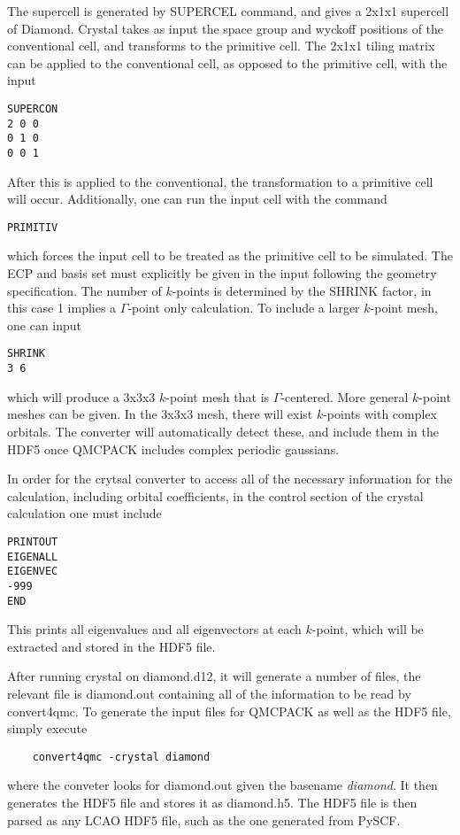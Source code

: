 The supercell is generated by SUPERCEL command, and gives a 2x1x1 supercell of Diamond. 
Crystal takes as input the space group and wyckoff positions of the conventional cell, and transforms to the primitive cell.
The 2x1x1 tiling matrix can be applied to the conventional cell, as opposed to the primitive cell, with the input
\begin{lstlisting}
SUPERCON
2 0 0
0 1 0
0 0 1
\end{lstlisting}
After this is applied to the conventional, the transformation to a primitive cell will occur.
Additionally, one can run the input cell with the command
\begin{lstlisting}
PRIMITIV
\end{lstlisting}
which forces the input cell to be treated as the primitive cell to be simulated.
The ECP and basis set must explicitly be given in the input following the geometry specification.
The number of $k$-points is determined by the SHRINK factor, in this case 1 implies a $\Gamma$-point only calculation. 
To include a larger $k$-point mesh, one can input
\begin{lstlisting}
SHRINK
3 6
\end{lstlisting}
which will produce a 3x3x3 $k$-point mesh that is $\Gamma$-centered. 
More general $k$-point meshes can be given. 
In the 3x3x3 mesh, there will exist $k$-points with complex orbitals. 
The converter will automatically detect these, and include them in the HDF5 once QMCPACK includes complex periodic gaussians. 


In order for the crytsal converter to access all of the necessary information for the calculation, including orbital coefficients, in the control section of the crystal calculation one must include
\begin{lstlisting}
PRINTOUT
EIGENALL
EIGENVEC
-999
END
\end{lstlisting}
This prints all eigenvalues and all eigenvectors at each $k$-point, which will be extracted and stored in the HDF5 file.


After running crystal on diamond.d12, it will generate a number of files, the relevant file is diamond.out containing all of the information to be read by convert4qmc.
To generate the input files for QMCPACK as well as the HDF5 file, simply execute
\begin{lstlisting}
    convert4qmc -crystal diamond
\end{lstlisting}
where the conveter looks for diamond.out given the basename {\it diamond}.
It then generates the HDF5 file and stores it as diamond.h5.
The HDF5 file is then parsed as any LCAO HDF5 file, such as the one generated from PySCF. 



